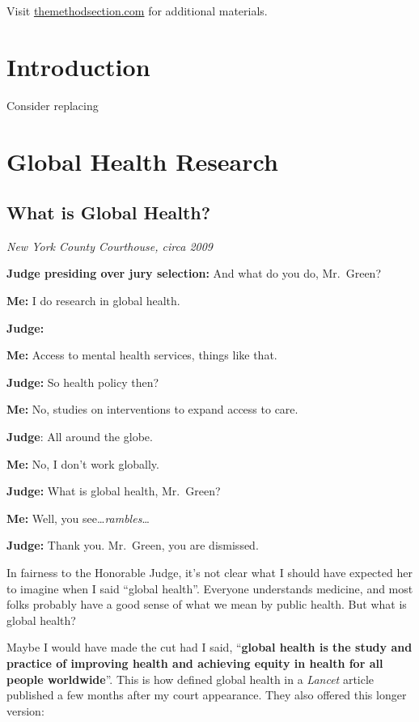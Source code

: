 \documentclass[justified,twoside,symmetric,]{tufte-book}
\renewcommand*{\citet}[1]{{\cite{#1}}}
\begin{document}
Visit \href{http://themethodsection.com/}{themethodsection.com} for additional materials.

\hypertarget{introduction}{%
\chapter*{Introduction}\label{introduction}}

Consider replacing

\hypertarget{ghr}{%
\chapter{Global Health Research}\label{ghr}}

\hypertarget{what-is-global-health}{%
\section{What is Global Health?}\label{what-is-global-health}}

\emph{New York County Courthouse, circa 2009}

\textbf{Judge presiding over jury selection:} And what do you do, Mr.~Green?

\textbf{Me:} I do research in global health.

\textbf{Judge:}

\textbf{Me:} Access to mental health services, things like that.

\textbf{Judge:} So health policy then?

\textbf{Me:} No, studies on interventions to expand access to care.

\textbf{Judge}: All around the globe.

\textbf{Me:} No, I don't work globally.

\textbf{Judge:} What is global health, Mr.~Green?

\textbf{Me:} Well, you see\ldots{}\emph{rambles}\ldots{}

\textbf{Judge:} Thank you. Mr.~Green, you are dismissed.

In fairness to the Honorable Judge, it's not clear what I should have expected her to imagine when I said ``global health''. Everyone understands medicine, and most folks probably have a good sense of what we mean by public health. But what is global health?

Maybe I would have made the cut had I said, ``\textbf{global health is the study and practice of improving health and achieving equity in health for all people worldwide}''. This is how \citet{koplan:2009} defined global health in a \emph{Lancet} article published a few months after my court appearance. They also offered this longer version:
\end{document}
